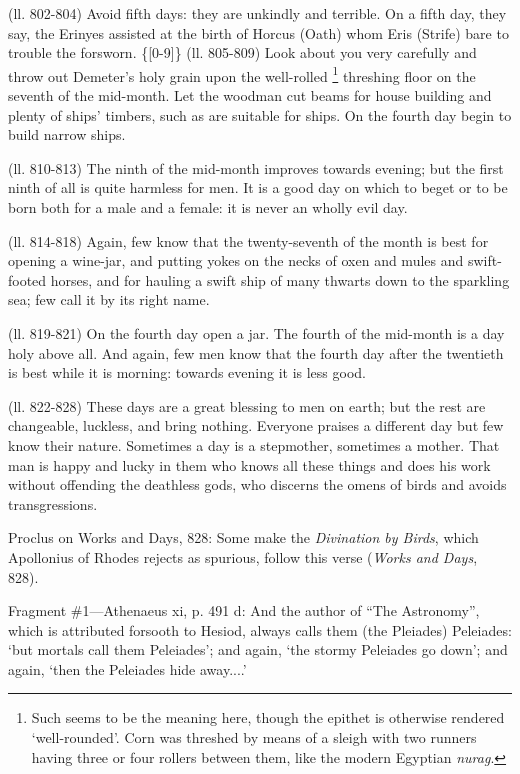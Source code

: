 (ll. 802-804) Avoid fifth days: they are unkindly and terrible. On a fifth day,
they say, the Erinyes assisted at the birth of Horcus (Oath) whom Eris (Strife)
bare to trouble the forsworn. \{[0-9]\} (ll. 805-809) Look about you very
carefully and throw out Demeter’s holy grain upon the well-rolled \footnote{Such seems to be the
meaning here, though the epithet is otherwise rendered
‘well-rounded’. Corn was threshed by means of a sleigh with two
runners having three or four rollers between them, like the modern Egyptian
\emph{nurag}.} threshing floor on the seventh of
the mid-month. Let the woodman cut beams for house building and plenty of
ships’ timbers, such as are suitable for ships. On the fourth day begin
to build narrow ships.

(ll. 810-813) The ninth of the mid-month improves towards evening; but the
first ninth of all is quite harmless for men. It is a good day on which to
beget or to be born both for a male and a female: it is never an wholly evil
day.

(ll. 814-818) Again, few know that the twenty-seventh of the month is best for
opening a wine-jar, and putting yokes on the necks of oxen and mules and
swift-footed horses, and for hauling a swift ship of many thwarts down to the
sparkling sea; few call it by its right name.

(ll. 819-821) On the fourth day open a jar. The fourth of the mid-month is a
day holy above all. And again, few men know that the fourth day after the
twentieth is best while it is morning: towards evening it is less good.

(ll. 822-828) These days are a great blessing to men on earth; but the rest are
changeable, luckless, and bring nothing. Everyone praises a different day but
few know their nature. Sometimes a day is a stepmother, sometimes a mother.
That man is happy and lucky in them who knows all these things and does his
work without offending the deathless gods, who discerns the omens of birds and
avoids transgressions.


Proclus on Works and Days, 828: Some make the \emph{Divination by Birds}, which
Apollonius of Rhodes rejects as spurious, follow this verse (\emph{Works and
Days}, 828).


Fragment \#1—Athenaeus xi, p. 491 d: And the author of “The
Astronomy”, which is attributed forsooth to Hesiod, always calls them
(the Pleiades) Peleiades: ‘but mortals call them Peleiades’; and
again, ‘the stormy Peleiades go down’; and again, ‘then the
Peleiades hide away....’

